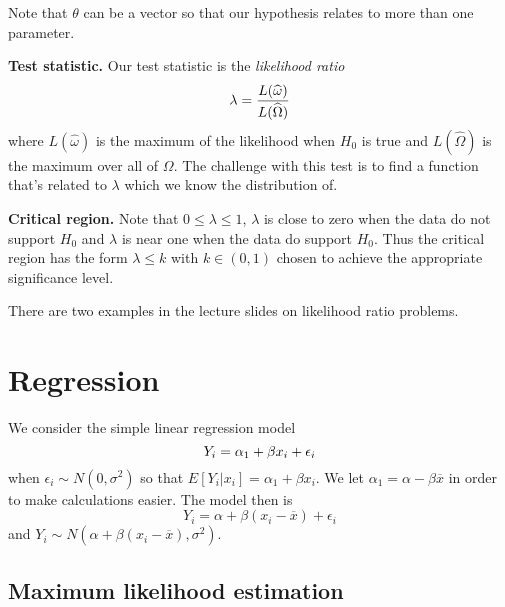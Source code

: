 \documentclass[10pt, two column]{article}
\begin{document}
Note that $\theta$ can be a vector so that our hypothesis relates to more than one parameter. 

{\bf Test statistic.} Our test statistic is the \emph{likelihood ratio} \vspace{-5pt}
\[
\lambda = \frac{L(\widehat{\omega})}{L(\widehat{\Omega})} \vspace{-5pt}
\]
where $L(\widehat{\omega})$ is the maximum of the likelihood when $H_{0}$ is true and $L(\widehat{\Omega})$ is the maximum over all of $\Omega$. The challenge with this test is to find a function that's related to $\lambda$ which we know the distribution of. 

{\bf Critical region.} Note that $0 \leq \lambda \leq 1$, $\lambda$ is close to zero when the data do not support $H_{0}$ and $\lambda$ is near one when the data do support $H_{0}$. Thus the critical region has the form $\lambda \leq k$ with $k \in (0,1)$ chosen to achieve the appropriate significance level.  

There are two examples in the lecture slides on likelihood ratio problems. 

\section{Regression}

We consider the simple linear regression model \vspace{-6pt}
\begin{equation}
Y_{i} = \alpha_{1} + \beta x_{i} + \epsilon_{i} \label{lm1}
\vspace{-6pt}
\end{equation}
when $\epsilon_{i} \sim N(0, \sigma^{2})$ so that $E[Y_{i} \vert x_{i}] = \alpha_{1} + \beta x_{i}$. We let $\alpha_{1} = \alpha - \beta\overline{x}$ in order to make calculations easier. The model then is
\begin{equation}  
Y_{i} = \alpha + \beta (x_{i} - \overline{x}) + \epsilon_{i} \label{lm2}
\end{equation}
and $Y_{i} \sim N( \alpha + \beta (x_{i} - \overline{x}), \sigma^{2})$. 

\subsection{Maximum likelihood estimation}
\end{document}
